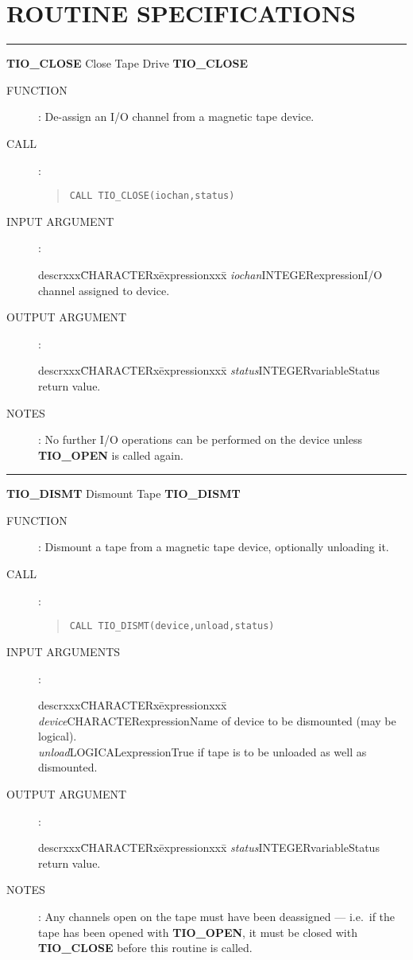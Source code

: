 \section {ROUTINE SPECIFICATIONS}
\goodbreak
\rule{\textwidth}{0.3mm}
{\Large {\bf TIO\_CLOSE} \hfill Close Tape Drive \hfill {\bf TIO\_CLOSE}}
\begin{description}
\item [FUNCTION]:
De-assign an I/O channel from a magnetic tape device.
\item [CALL]:
\begin{quote}
{\tt CALL TIO\_CLOSE(iochan,status)}
\end{quote}
\item [INPUT ARGUMENT]:
\begin{tabbing}
descrxxx\=CHARACTERx\=expressionxxx\=\kill
{\em iochan}\>INTEGER\>expression\>I/O channel assigned to device.
\end{tabbing}
\item [OUTPUT ARGUMENT]:
\begin{tabbing}
descrxxx\=CHARACTERx\=expressionxxx\=\kill
{\em status}\>INTEGER\>variable\>Status return value.
\end{tabbing}
\item [NOTES]:
No further I/O operations can be performed on the device unless {\bf TIO\_OPEN}
is called again.
\end{description}
\goodbreak
\rule{\textwidth}{0.3mm}
{\Large {\bf TIO\_DISMT} \hfill Dismount Tape \hfill {\bf TIO\_DISMT}}
\begin{description}
\item [FUNCTION]:
Dismount a tape from a magnetic tape device, optionally unloading it.
\item [CALL]:
\begin{quote}
{\tt CALL TIO\_DISMT(device,unload,status)}
\end{quote}
\item [INPUT ARGUMENTS]:
\begin{tabbing}
descrxxx\=CHARACTERx\=expressionxxx\=\kill
{\em device}\>CHARACTER\>expression\>Name of device to be dismounted (may
be logical).\\
{\em unload}\>LOGICAL\>expression\>True if tape is to be unloaded as well as
dismounted.
\end{tabbing}
\item [OUTPUT ARGUMENT]:
\begin{tabbing}
descrxxx\=CHARACTERx\=expressionxxx\=\kill
{\em status}\>INTEGER\>variable\>Status return value.
\end{tabbing}
\item [NOTES]:
Any channels open on the tape must have been deassigned --- i.e.\ if the tape
has been opened with {\bf TIO\_OPEN}, it must be closed with {\bf TIO\_CLOSE}
before this routine is called.
\end{description}
